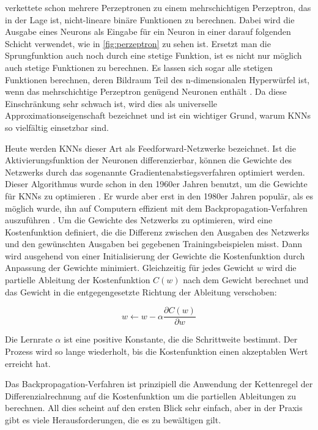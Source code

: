  verkettete schon mehrere Perzeptronen zu einem mehrschichtigen Perzeptron, das in der Lage ist, nicht-lineare binäre Funktionen zu berechnen.
Dabei wird die Ausgabe eines Neurons als Eingabe für ein Neuron in einer darauf folgenden Schicht verwendet, wie in \ref{fig:perzeptron} zu sehen ist.
Ersetzt man die Sprungfunktion auch noch durch eine stetige Funktion, ist es nicht nur möglich auch stetige Funktionen zu berechnen.
Es lassen sich sogar alle stetigen Funktionen berechnen, deren Bildraum Teil des n-dimensionalen Hyperwürfel ist, wenn das mehrschichtige Perzeptron genügend Neuronen enthält \cite{Amari1967, Cybenko1989}.
Da diese Einschränkung sehr schwach ist, wird dies als universelle Approximationseigenschaft bezeichnet und ist ein wichtiger Grund, warum KNNs so vielfältig einsetzbar sind.

Heute werden KNNs dieser Art als Feedforward-Netzwerke bezeichnet.
Ist die Aktivierungsfunktion der Neuronen differenzierbar, können die Gewichte des Netzwerks durch das sogenannte Gradientenabstiegsverfahren optimiert werden.
Dieser Algorithmus wurde schon in den 1960er Jahren benutzt, um die Gewichte für KNNs zu optimieren \cite{Amari1967}.
Er wurde aber erst in den 1980er Jahren populär, als es möglich wurde, ihn auf Computern effizient mit dem Backpropagation-Verfahren auszuführen \cite{Rumelhart1986}.
Um die Gewichte des Netzwerks zu optimieren, wird eine Kostenfunktion definiert, die die Differenz zwischen den Ausgaben des Netzwerks und den gewünschten Ausgaben bei gegebenen Trainingsbeispielen misst.
Dann wird ausgehend von einer Initialisierung der Gewichte die Kostenfunktion durch Anpassung der Gewichte minimiert.
Gleichzeitig für jedes Gewicht $w$ wird die partielle Ableitung der Kostenfunktion $C(w)$ nach dem Gewicht berechnet und das Gewicht in die entgegengesetzte Richtung der Ableitung verschoben:

$$
w \leftarrow w - \alpha \frac{\partial C(w)}{\partial w}
$$

Die Lernrate $\alpha$ ist eine positive Konstante, die die Schrittweite bestimmt.
Der Prozess wird so lange wiederholt, bis die Kostenfunktion einen akzeptablen Wert erreicht hat.

Das Backpropagation-Verfahren ist prinzipiell die Anwendung der Kettenregel der Differenzialrechnung auf die Kostenfunktion um die partiellen Ableitungen zu berechnen.
All dies scheint auf den ersten Blick sehr einfach, aber in der Praxis gibt es viele Herausforderungen, die es zu bewältigen gilt.

